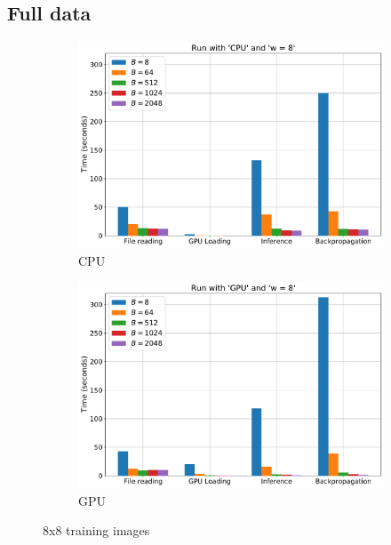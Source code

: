 \documentclass{article}
\begin{document}
{        \subsection*{Full data}
        {
            \begin{figure}[H]
                \centering
                \begin{subfigure}[]{0.45 \textwidth}
                    \includegraphics[width = 1.0 \textwidth]{Figures/cpu_8x8_full.pdf}
                    \caption{CPU}
                \end{subfigure}
                \begin{subfigure}[]{0.45 \textwidth}
                    \includegraphics[width = 1.0 \textwidth]{Figures/gpu_8x8_full.pdf}
                    \caption{GPU}
                \end{subfigure}
                \caption{8x8 training images}
            \end{figure}

}}
\end{document}

